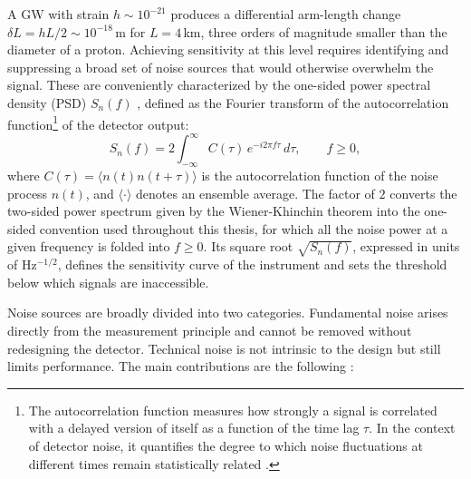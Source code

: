 A GW with strain $h \sim 10^{-21}$ produces a differential arm-length change $\delta L = hL/2 \sim 10^{-18}$\,m for $L = 4$\,km, three orders of magnitude smaller than the diameter of a proton. Achieving sensitivity at this level requires identifying and suppressing a broad set of noise sources that would otherwise overwhelm the signal. These are conveniently characterized by the one-sided power spectral density (PSD) $S_n(f)$ \cite{PSD_book}, defined as the Fourier transform of the autocorrelation function\footnote{
The autocorrelation function measures how strongly a signal is correlated with a delayed version of itself as a function of the time lag $\tau$. In the context of detector noise, it quantifies the degree to which noise fluctuations at different times remain statistically related \cite{PSD_book}.
} of the detector output: 
\begin{equation}
    S_n(f) = 2\int_{-\infty}^{\infty} C(\tau)\, e^{-i 2\pi f \tau} \, d\tau , \qquad f\geq 0,
\label{PSD_eq}
\end{equation}
where $C(\tau) = \langle n(t) n(t+\tau) \rangle$ is the autocorrelation function of the noise process $n(t)$, and $\langle \cdot \rangle$ denotes an ensemble average. The factor of $2$ converts the two-sided power spectrum given by the Wiener-Khinchin theorem into the one-sided convention used throughout this thesis, for which all the noise power at a given frequency is folded into $f\geq0$.
Its square root $\sqrt{S_n(f)}$, expressed in units of Hz$^{-1/2}$, defines the sensitivity curve of the instrument and sets the threshold below which signals are inaccessible.



Noise sources are broadly divided into two categories. 
Fundamental noise arises directly from the measurement principle and cannot be removed without redesigning the detector. Technical noise is not intrinsic to the design but still limits performance. The main contributions are the following \cite{Advanced_ligo,noise_budget_O4}:


